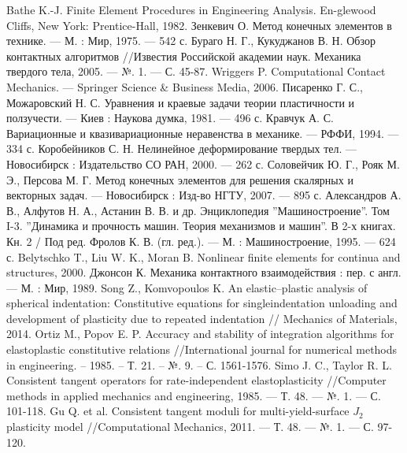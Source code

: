 \documentclass[]{article}
\begin{document}
\begin{thebibliography}{3}
Bathe K.-J. Finite Element Procedures in Engineering Analysis. En-glewood Cliffs, New York: Prentice-Hall, 1982.
Зенкевич О. Метод конечных элементов в технике. --- М. : Мир, 1975. --- 542 с.
Бураго Н. Г., Кукуджанов В. Н. Обзор контактных алгоритмов //Известия Российской академии наук. Механика твердого тела, 2005. --- №. 1. --- С. 45-87.
Wriggers P. Computational Contact Mechanics. --- Springer Science \& Business Media, 2006.
Писаренко Г. С., Можаровский Н. С. Уравнения и краевые задачи теории пластичности и ползучести. --- Киев : Наукова думка, 1981. --- 496 с.
Кравчук А. С. Вариационные и квазивариационные неравенства в механике. --- РФФИ, 1994. --- 334 с.
Коробейников С. Н. Нелинейное деформирование твердых тел. --- Новосибирск : Издательство СО РАН, 2000. --- 262 с.
Соловейчик Ю. Г., Рояк М. Э., Персова М. Г. Метод конечных элементов для решения скалярных и векторных задач. --- Новосибирск : Изд-­во НГТУ, 2007. --- 895 с.
Александров А. В., Алфутов Н. А., Астанин В. В. и др. Энциклопедия ”Машиностроение”. Том I-­3. ”Динамика и прочность машин. Теория механизмов и машин”. В 2-­х книгах. Кн. 2 / Под ред. Фролов К. В. (гл. ред.). --- М. : Машиностроение, 1995. --- 624 с.
Belytschko T., Liu W. K., Moran B. Nonlinear finite elements for continua and structures, 2000.
Джонсон К. Механика контактного взаимодействия : пер. с англ. --- М. : Мир, 1989.
Song Z., Komvopoulos K. An elastic–plastic analysis of spherical inden­tation: Constitutive equations for single­indentation unloading and development of plasticity due to repeated indentation // Mechanics of Materials, 2014.
Ortiz M., Popov E. P. Accuracy and stability of integration algorithms for elastoplastic constitutive relations //International journal for numerical methods in engineering. – 1985. – Т. 21. – №. 9. – С. 1561-1576.
Simo J. C., Taylor R. L. Consistent tangent operators for rate-independent elastoplasticity //Computer methods in applied mechanics and engineering, 1985. --- Т. 48. --- №. 1. --- С. 101-118.
Gu Q. et al. Consistent tangent moduli for multi-yield-surface $J_2$ plasticity model //Computational Mechanics, 2011. --- Т. 48. --- №. 1. --- С. 97-120.
\end{thebibliography}
\end{document}
